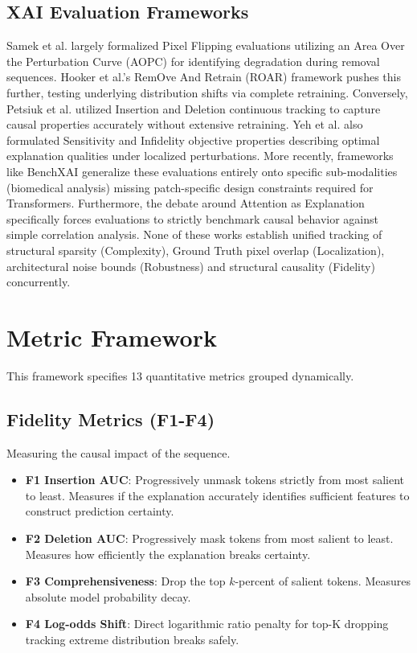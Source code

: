 \documentclass[10pt,journal,compsoc]{IEEEtran}
\begin{document}
\subsection{XAI Evaluation Frameworks}
Samek et al. largely formalized Pixel Flipping evaluations utilizing an Area Over the Perturbation Curve (AOPC) for identifying degradation during removal sequences. Hooker et al.'s RemOve And Retrain (ROAR) framework pushes this further, testing underlying distribution shifts via complete retraining. 
Conversely, Petsiuk et al. utilized Insertion and Deletion continuous tracking to capture causal properties accurately without extensive retraining. Yeh et al. also formulated Sensitivity and Infidelity objective properties describing optimal explanation qualities under localized perturbations. More recently, frameworks like BenchXAI generalize these evaluations entirely onto specific sub-modalities (biomedical analysis) missing patch-specific design constraints required for Transformers. Furthermore, the debate around Attention as Explanation specifically forces evaluations to strictly benchmark causal behavior against simple correlation analysis. None of these works establish unified tracking of structural sparsity (Complexity), Ground Truth pixel overlap (Localization), architectural noise bounds (Robustness) and structural causality (Fidelity) concurrently. 

\section{Metric Framework}
\label{sec:metric_framework}
This framework specifies 13 quantitative metrics grouped dynamically. 

\subsection{Fidelity Metrics (F1-F4)}
Measuring the causal impact of the sequence.
\begin{itemize}
    \item \textbf{F1 Insertion AUC}: Progressively unmask tokens strictly from most salient to least. Measures if the explanation accurately identifies sufficient features to construct prediction certainty.
    \item \textbf{F2 Deletion AUC}: Progressively mask tokens from most salient to least. Measures how efficiently the explanation breaks certainty.
    \item \textbf{F3 Comprehensiveness}: Drop the top $k$-percent of salient tokens. Measures absolute model probability decay. 
    \item \textbf{F4 Log-odds Shift}: Direct logarithmic ratio penalty for top-K dropping tracking extreme distribution breaks safely.
\end{itemize}
\end{document}
